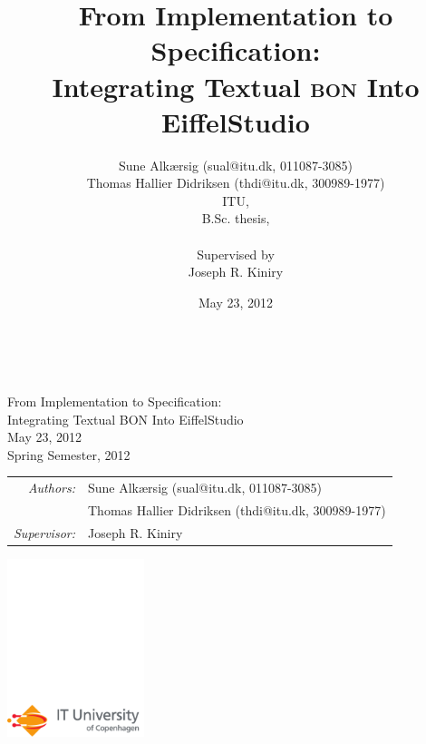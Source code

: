 \documentclass[12pt,a4paper]{report}
\author{Sune Alk\ae rsig (sual@itu.dk, 011087-3085) \\ Thomas Hallier Didriksen (thdi@itu.dk, 300989-1977)  \\ 
		ITU, \\
		B.Sc. thesis, \\ \\
		Supervised by \\
		Joseph R. Kiniry}
\title{From Implementation to Specification: \\ \large{Integrating Textual \textsc{bon} Into EiffelStudio}}
\date{May 23, 2012}
\begin{document}
\begin{titlepage}
\ \\
\vspace{3cm}
\begin{center}
{\huge\sffamily
From Implementation to Specification:\\
Integrating Textual BON Into EiffelStudio
\\}\bigskip
{\large\sffamily
May 23, 2012
\\}
{\sffamily Spring Semester, 2012}
\end{center}
\vspace{3cm}
\large
\begin{center}
\begin{tabular}{r@{ }l}
\emph{\sffamily Authors:} & \textsf{Sune Alk\ae rsig (sual@itu.dk, 011087-3085)}\\
 & \textsf{Thomas Hallier Didriksen (thdi@itu.dk, 300989-1977)}\\
\emph{\sffamily Supervisor:} & \textsf{Joseph R. Kiniry}
\end{tabular}
\end{center}
\vfill
\includegraphics[width=4cm]{ITU_logo_ENG_horisontal}
\end{titlepage}


\tableofcontents
\listoffigures








\end{document}
